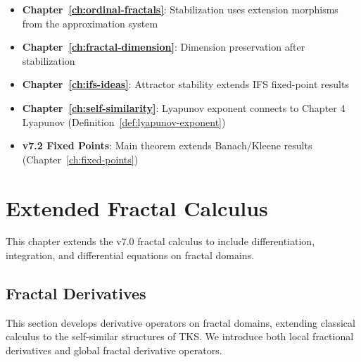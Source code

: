 \begin{remark}
\label{rem:ch5-connections}
\begin{itemize}
  \item \textbf{Chapter~\ref{ch:ordinal-fractals}}: Stabilization uses extension morphisms from the approximation system
  \item \textbf{Chapter~\ref{ch:fractal-dimension}}: Dimension preservation after stabilization
  \item \textbf{Chapter~\ref{ch:ifs-ideas}}: Attractor stability extends IFS fixed-point results
  \item \textbf{Chapter~\ref{ch:self-similarity}}: Lyapunov exponent connects to Chapter 4 Lyapunov (Definition~\ref{def:lyapunov-exponent})
  \item \textbf{v7.2 Fixed Points}: Main theorem extends Banach/Kleene results (Chapter~\ref*{ch:fixed-points})
\end{itemize}
\end{remark}

\chapter{Extended Fractal Calculus}
\label{ch:extended-fractal-calculus}

\begin{tcolorbox}[colback=blue!5!white,colframe=blue!75!black,title=\vnewthree]
This chapter extends the v7.0 fractal calculus to include differentiation, integration, and differential equations on fractal domains.
\end{tcolorbox}

\section{Fractal Derivatives}
\label{sec:fractal-derivatives}

\begin{tcolorbox}[colback=blue!5!white,colframe=blue!75!black,title=\vnewthree]
This section develops derivative operators on fractal domains, extending classical calculus to the self-similar structures of TKS. We introduce both local fractional derivatives and global fractal derivative operators.
\end{tcolorbox}

